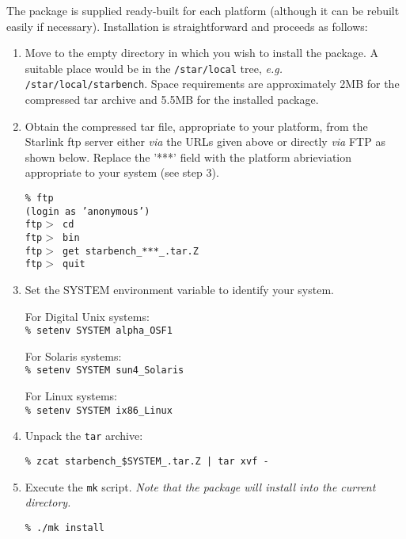 
\pagebreak
The package is supplied ready-built for each platform (although it can
be rebuilt easily if necessary). Installation is straightforward and
proceeds as follows:

\begin{enumerate}
\item Move to the empty directory in which you wish to install the package.
A suitable place would be in the {\tt /star/local} tree, {\em e.g.}
{\tt /star/local/starbench}. Space requirements are approximately 2MB for
the compressed tar archive and 5.5MB for the installed package.

\item Obtain the compressed tar file, appropriate to your platform, from
the Starlink ftp server either {\em via} the URLs given above or
directly {\em via} FTP as shown below. Replace the '***' field with the
platform abrieviation appropriate to your system (see step 3).

{\tt    \% ftp \pkgftpsrv            \\
        (login as 'anonymous')                 \\
        ftp$>$ cd \pkgftpdir                   \\
        ftp$>$ bin                             \\
        ftp$>$ get starbench\_***\_\pkgver.tar.Z   \\
        ftp$>$ quit }

\item Set the SYSTEM environment variable to identify your system.

For Digital Unix systems: \\
{\tt \% setenv SYSTEM alpha\_OSF1}

For Solaris systems: \\
{\tt \% setenv SYSTEM sun4\_Solaris}

For Linux systems: \\
{\tt \% setenv SYSTEM ix86\_Linux}

\item Unpack the {\tt tar} archive:

{\tt \% zcat starbench\_\$SYSTEM\_\pkgver.tar.Z | tar xvf - }

\item Execute the {\tt mk} script. {\em Note that the package will
install into the current directory.}

{\tt \% ./mk install}
\end{enumerate}

